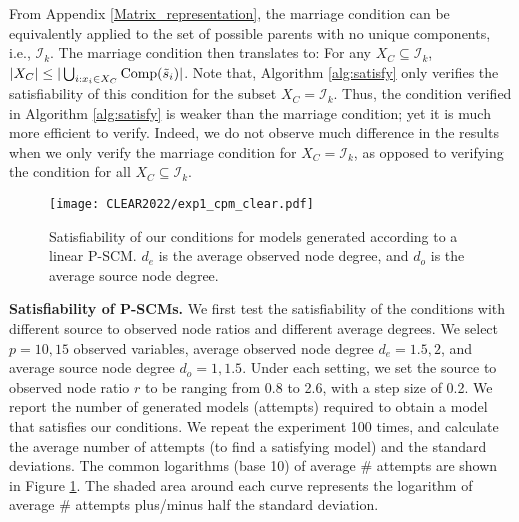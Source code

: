 \documentclass[12pt]{article}
\begin{document}
From Appendix \ref{Matrix_representation}, the marriage condition can be equivalently applied to the set of possible parents with no unique components, i.e., $\mathcal{I}_k$. The marriage condition then translates to: For any
$X_C \subseteq \mathcal{I}_k$, $|X_C| \leq | \bigcup_{i:x_i\in X_C} {\rm{Comp}}(\tilde{s}_i) |$.
Note that, Algorithm \ref{alg:satisfy} only verifies the satisfiability of this condition for the subset $X_C = \mathcal{I}_k$. Thus, the condition verified in Algorithm \ref{alg:satisfy} is weaker than the marriage condition; yet it is much more efficient to verify. Indeed, we do not observe much difference in the results when we only verify the marriage condition for $X_C=\mathcal{I}_k$, as opposed to verifying the condition for all $X_C \subseteq \mathcal{I}_k$. 


\begin{figure}[t]
  \centering
  \texttt{[image: CLEAR2022/exp1\_cpm\_clear.pdf]} %
  \caption{Satisfiability of our conditions for models generated according to a linear P-SCM. $d_e$ is the average observed node degree, and $d_o$ is the average source node degree.}
  \label{fig:satis1}
\end{figure}

\textbf{Satisfiability of P-SCMs. }
We first test the satisfiability of the conditions with different source to observed node ratios and different average degrees. We select $p=10, 15$ observed variables, average observed node degree $d_e= 1.5, 2$, and average source node degree $d_o= 1, 1.5$. Under each setting, we set the source to observed node ratio $r$ to be ranging from 0.8 to 2.6, with a step size of 0.2. We report the number of generated models (attempts) required to obtain a model that satisfies our conditions. We repeat the experiment 100 times, and calculate the average number of attempts (to find a satisfying model) and the standard deviations.
The common logarithms (base 10) of average \# attempts are shown in Figure \ref{fig:satis1}. The shaded area around each curve represents the logarithm of average \# attempts plus/minus half the standard deviation.
\end{document}
